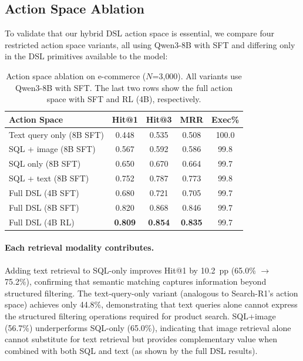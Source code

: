 \documentclass[11pt]{article}
\begin{document}
\subsection{Action Space Ablation}
\label{sec:action_space}

To validate that our hybrid DSL action space is essential, we compare four restricted action space variants, all using Qwen3-8B with SFT and differing only in the DSL primitives available to the model:

\begin{table}[t]
\centering
\small
\caption{Action space ablation on e-commerce ($N$=3{,}000). All variants use Qwen3-8B with SFT. The last two rows show the full action space with SFT and RL (4B), respectively.}
\label{tab:action_space}
\begin{tabular}{lcccc}
\toprule
\textbf{Action Space} & \textbf{Hit@1} & \textbf{Hit@3} & \textbf{MRR} & \textbf{Exec\%} \\
\midrule
Text query only (8B SFT) & 0.448 & 0.535 & 0.508 & 100.0 \\
SQL + image (8B SFT) & 0.567 & 0.592 & 0.586 & 99.8 \\
SQL only (8B SFT) & 0.650 & 0.670 & 0.664 & 99.7 \\
SQL + text (8B SFT) & 0.752 & 0.787 & 0.773 & 99.8 \\
\midrule
Full DSL (4B SFT) & 0.680 & 0.721 & 0.705 & 99.7 \\
Full DSL (8B SFT) & 0.820 & 0.868 & 0.846 & 99.7 \\
Full DSL (4B RL) & \textbf{0.809} & \textbf{0.854} & \textbf{0.835} & 99.7 \\
\bottomrule
\end{tabular}
\end{table}

\paragraph{Each retrieval modality contributes.}
Adding text retrieval to SQL-only improves Hit@1 by 10.2~pp (65.0\% $\to$ 75.2\%), confirming that semantic matching captures information beyond structured filtering.
The text-query-only variant (analogous to Search-R1's action space) achieves only 44.8\%, demonstrating that text queries alone cannot express the structured filtering operations required for product search.
SQL+image (56.7\%) underperforms SQL-only (65.0\%), indicating that image retrieval alone cannot substitute for text retrieval but provides complementary value when combined with both SQL and text (as shown by the full DSL results).
\end{document}
